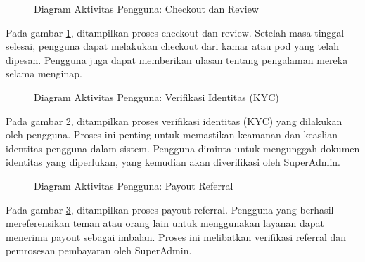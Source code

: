 \begin{figure}[H] %
    \centering
    \caption{Diagram Aktivitas Pengguna: Checkout dan Review}
    \label{fig:ad_user_checkout} %
\end{figure}

Pada gambar \ref{fig:ad_user_checkout}, ditampilkan proses checkout dan review. Setelah masa tinggal selesai, pengguna dapat melakukan checkout dari kamar atau pod yang telah dipesan. Pengguna juga dapat memberikan ulasan tentang pengalaman mereka selama menginap.

\begin{figure}[H] %
    \centering
    \caption{Diagram Aktivitas Pengguna: Verifikasi Identitas (KYC)}
    \label{fig:ad_user_kyc} %
\end{figure}

Pada gambar \ref{fig:ad_user_kyc}, ditampilkan proses verifikasi identitas (KYC) yang dilakukan oleh pengguna. Proses ini penting untuk memastikan keamanan dan keaslian identitas pengguna dalam sistem. Pengguna diminta untuk mengunggah dokumen identitas yang diperlukan, yang kemudian akan diverifikasi oleh SuperAdmin.

\begin{figure}[H] %
    \centering
    \caption{Diagram Aktivitas Pengguna: Payout Referral}
    \label{fig:ad_user_payout} %
\end{figure}

Pada gambar \ref{fig:ad_user_payout}, ditampilkan proses payout referral. Pengguna yang berhasil mereferensikan teman atau orang lain untuk menggunakan layanan dapat menerima payout sebagai imbalan. Proses ini melibatkan verifikasi referral dan pemrosesan pembayaran oleh SuperAdmin.

